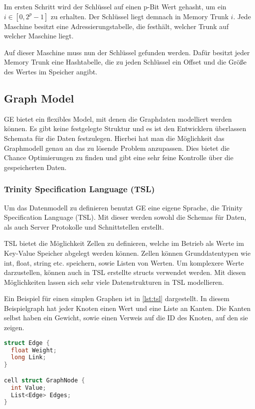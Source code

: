 Im ersten Schritt wird der Schlüssel auf einen p-Bit Wert gehasht, um ein  $ i \in [0, 2^{p} - 1] $ zu erhalten. Der Schlüssel liegt demnach in
Memory Trunk $ i $. Jede Maschine besitzt eine Adressierungstabelle, die festhält, welcher Trunk auf welcher Maschine liegt.

Auf dieser Maschine muss nun der Schlüssel gefunden werden. Dafür besitzt jeder Memory Trunk eine Hashtabelle, die zu jeden Schlüssel
ein Offset und die Größe des Wertes im Speicher angibt.

\subsection{Graph Model}

GE bietet ein flexibles Model, mit denen die Graphdaten modelliert werden können. Es gibt keine festgelegte Struktur und es ist den Entwicklern
überlassen Schemata für die Daten festzulegen. Hierbei hat man die Möglichkeit das Graphmodell genau an das zu lösende Problem anzupassen.
Dies bietet die Chance Optimierungen zu finden und gibt eine sehr feine Kontrolle über die gespeicherten Daten.

\subsubsection{Trinity Specification Language (TSL)}

Um das Datenmodell zu definieren benutzt GE eine eigene Sprache, die Trinity Specification Language (TSL). Mit dieser werden sowohl die Schemas
für Daten, als auch Server Protokolle und Schnittstellen erstellt. 

TSL bietet die Möglichkeit Zellen zu definieren, welche im Betrieb als Werte im Key-Value Speicher abgelegt werden können.
Zellen können Grunddatentypen wie int, float, string etc. speichern, sowie Listen von Werten. Um komplexere Werte darzustellen, können auch in TSL erstellte structs verwendet werden.
Mit diesen Möglichkeiten lassen sich sehr viele Datenstrukturen in TSL modellieren. 

Ein Beispiel für einen simplen Graphen ist in  \ref{lst:tsl} dargestellt. In diesem Beispielgraph hat jeder Knoten 
einen Wert und eine Liste an Kanten. Die Kanten selbst haben ein Gewicht, sowie einen Verweis auf die ID des Knoten, auf den sie zeigen.

\begin{lstlisting}[language=c,label={lst:tsl}, caption={Beispiel für einen in TSL definierte Graphenstruktur}]
struct Edge {
  float Weight;
  long Link;
}

cell struct GraphNode {
  int Value;
  List<Edge> Edges;
}
\end{lstlisting}



